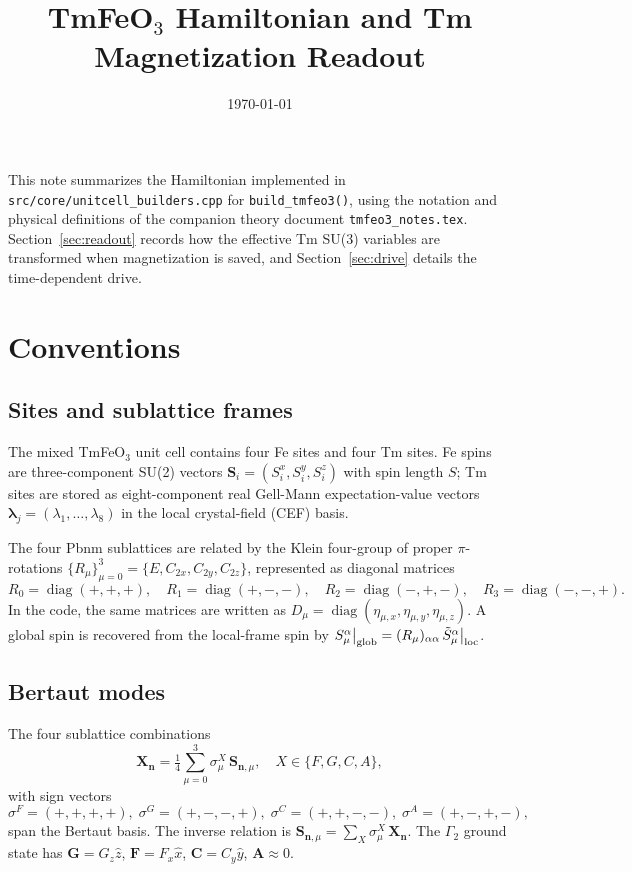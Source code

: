 \documentclass[11pt]{article}
\title{TmFeO$_3$ Hamiltonian and Tm Magnetization Readout}
\author{}
\date{\today}
\DeclareMathOperator{\diag}{diag}
\newcommand{\bS}{\mathbf{S}}
\begin{document}
\maketitle

This note summarizes the Hamiltonian implemented in
\texttt{src/core/unitcell\_builders.cpp} for \texttt{build\_tmfeo3()},
using the notation and physical definitions of the companion theory
document \texttt{tmfeo3\_notes.tex}. Section~\ref{sec:readout} records
how the effective Tm SU(3) variables are transformed when magnetization
is saved, and Section~\ref{sec:drive} details the time-dependent drive.

\tableofcontents

\section{Conventions}
\label{sec:conventions}

\subsection{Sites and sublattice frames}

The mixed TmFeO$_3$ unit cell contains four Fe sites and four Tm sites.
Fe spins are three-component SU(2) vectors $\bS_i = (S_i^x, S_i^y,
S_i^z)$ with spin length $S$; Tm sites are stored as eight-component
real Gell-Mann expectation-value vectors
$\boldsymbol{\lambda}_j = (\lambda_1, \dots, \lambda_8)$ in the local
crystal-field (CEF) basis.

The four Pbnm sublattices are related by the Klein four-group of proper
$\pi$-rotations $\{R_\mu\}_{\mu=0}^{3} = \{E, C_{2x}, C_{2y}, C_{2z}\}$,
represented as diagonal matrices
\begin{equation}
R_0 = \diag(+,+,+),\quad R_1 = \diag(+,-,-),\quad
R_2 = \diag(-,+,-),\quad R_3 = \diag(-,-,+).
\end{equation}
In the code, the same matrices are written as
$D_\mu = \diag(\eta_{\mu,x}, \eta_{\mu,y}, \eta_{\mu,z})$.  A global
spin is recovered from the local-frame spin by
$S^\alpha_\mu\big|_{\rm glob} = (R_\mu)_{\alpha\alpha}\,\tilde S^\alpha_\mu\big|_{\rm loc}$.

\subsection{Bertaut modes}

The four sublattice combinations
\begin{equation}
\mathbf{X}_{\mathbf{n}} = \tfrac14\sum_{\mu=0}^{3} \sigma^X_\mu\,\bS_{\mathbf{n},\mu},
\quad X \in \{F,G,C,A\},
\end{equation}
with sign vectors
\begin{equation}
\sigma^F=(+,+,+,+),\;\sigma^G=(+,-,-,+),\;
\sigma^C=(+,+,-,-),\;\sigma^A=(+,-,+,-),
\end{equation}
span the Bertaut basis.  The inverse relation is
$\bS_{\mathbf{n},\mu} = \sum_X \sigma^X_\mu\,\mathbf{X}_\mathbf{n}$.
The $\Gamma_2$ ground state has $\mathbf{G} = G_z\hat z$,
$\mathbf{F} = F_x\hat x$, $\mathbf{C} = C_y\hat y$, $\mathbf{A}\approx 0$.
\end{document}
